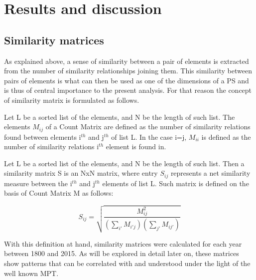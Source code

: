 \documentclass[article]{article}
\begin{document}
\section{Results and discussion}

\subsection{Similarity matrices}

As explained above, a sense of similarity between a pair of elements is extracted from the number of similarity relationships joining them. This similarity between pairs of elements is what can then be used as one of the dimensions of a PS and is thus of central importance to the present analysis.
For that reason the concept of similarity matrix is formulated as follows.

\begin{definition}
\label{def:CountMatrix} 

Let L be a sorted list of the elements, and N be the length of such list.
The elements $M_{ij}$ of a Count Matrix are defined as the number of similarity relations found between elements i$^{th}$ and j$^{th}$ of list L. In the case i=j, $M_{ii}$ is defined as the number of similarity relations i$^{th}$ element is found in.

\end{definition}

\begin{definition}
\label{def:simMat} 

Let L be a sorted list of the elements, and N be the length of such list.
Then a similarity matrix S is an NxN matrix, where entry $S_{ij}$ represents a net similarity measure between the i$^{th}$ and j$^{th}$ elements of list L. 
Such matrix is defined on the basis of Count Matrix M as follows:

	\begin{equation}
		S_{ij} = \sqrt{\frac{M_{ij}^2}{(\sum_{i'}{M_{i'j}})(\sum_{j'}{M_{ij'}})}}
	\end{equation}

\end{definition}

With this definition at hand, similarity matrices were calculated for each year between 1800 and 2015. As will be explored in detail later on, these matrices show patterns that can be correlated with and understood under the light of the well known MPT.\\
\end{document}
